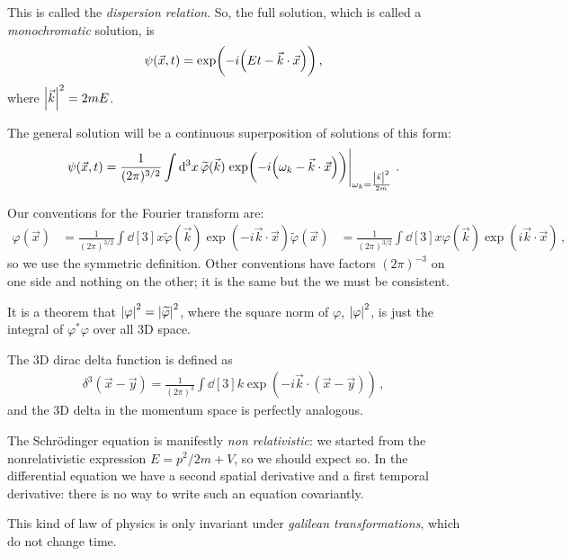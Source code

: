 \documentclass[main.tex]{subfiles}
\begin{document}
This is called the \emph{dispersion relation}. So, the full solution, which is called a \emph{monochromatic} solution, is 
%
\begin{align}
\psi (\vec{x}, t) = \exp(-i \qty(Et - \vec{k} \cdot \vec{x}))
\,,
\end{align}
%
where \(\abs{\vec{k}}^2 = 2mE\).

The general solution will be a continuous superposition of solutions of this form: 
%
\begin{align}
\psi (\vec{x}, t) = \frac{1}{(2\pi )^{3/2}} \int \dd[3]{x} \widetilde{\varphi} (\vec{k}) \eval{\exp(-i \qty(\omega_{k} - \vec{k} \cdot \vec{x}))}_{\omega_{k} = \frac{\abs{\vec{k}}^2}{2m}}
\,.
\end{align}

Our conventions for the Fourier transform are:
%
\begin{align}
\varphi (\vec{x}) &= \frac{1}{(2\pi )^{3/2}} \int \dd[3]{x} \widetilde{\varphi} (\vec{k}) \exp(-i \vec{k}\cdot \vec{x})
\widetilde{\varphi} (\vec{x}) &= \frac{1}{(2\pi )^{3/2}} \int \dd[3]{x} \varphi (\vec{k}) \exp(i \vec{k}\cdot \vec{x})
\,,
\end{align}
%
so we use the symmetric definition. Other conventions have factors \((2\pi )^{-3}\) on one side and nothing on the other; it is the same but the we must be consistent. 

It is a theorem that \(\abs{\varphi }^2 = \abs{\widetilde{\varphi}}^2\), where the square norm of \(\varphi \), \(\abs{\varphi}^2\), is just the integral of \(\varphi^{*} \varphi \) over all 3D space. 

The 3D dirac delta function is defined as 
%
\begin{align}
\delta^{3 } (\vec{x} - \vec{y}) = \frac{1}{(2\pi )^3}
\int \dd[3]{k} \exp(- i \vec{k} \cdot (\vec{x} - \vec{y}))
\,,
\end{align}
%
and the 3D delta in the momentum space is perfectly analogous. 

The Schrödinger equation is manifestly \emph{non relativistic}: we started from the nonrelativistic expression \(E = p^2/2m + V\), so we should expect so. 
In the differential equation we have a second spatial derivative and a first temporal derivative: there is no way to write such an equation  covariantly. 

This kind of law of physics is only invariant under \emph{galilean transformations}, which do not change time. 
\end{document}
